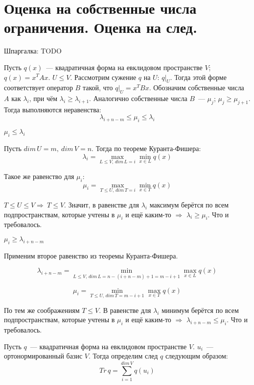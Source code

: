 \section{
 Оценка на собственные числа ограничения. Оценка на след.
}

Шпаргалка: TODO


Пусть $q(x)$~--- квадратичная форма на евклидовом пространстве $V$; $q(x) = x^TAx$. $U \le V$. Рассмотрим сужение $q$ на $U$: $q|_U$. Тогда этой форме соответствует оператор $B$ такой, что $q|_U = x^TBx$. Обозначим собственные числа $A$ как $\lambda_i$, при чём $\lambda_i \ge \lambda_{i+1}$. Аналогично собственные числа $B$~--- $\mu_j$; $\mu_j\ge \mu_{j + 1}$. Тогда выполняются неравенства:
$$
\lambda_{i+n-m}\le\mu_i\le\lambda_i
$$

\proofname

$\mu_i\le\lambda_i$

Пусть $dim\,U = m,\ dim\,V = n$. Тогда по теореме Куранта-Фишера:
$$
\lambda_i = \max\limits_{L \le V,\,dim\,L = i} \min\limits_{x\in L} q(x) 
$$

Такое же равенство для $\mu_i$:
$$
\mu_i = \max\limits_{T \le U,\,dim\,T = i} \min\limits_{x\in T} q(x) 
$$

$T\le U\le V\Rightarrow\ T\le V$. Значит, в равенстве для $\lambda_i$ максимум берётся по всем подпространствам, которые учтены в $\mu_i$ и ещё каким-то $\Rightarrow$ $\lambda_i \ge \mu_i$. Что и требовалось.

$\mu_i \ge \lambda_{i + n - m}$

Применим второе равенство из теоремы Куранта-Фишера.

$$
\lambda_{i+n-m} = \min\limits_{L \le V,\,dim\,L = n - (i + n - m) + 1 = m - i + 1} \max\limits_{x\in L} q(x) 
$$

$$
\mu_i = \min\limits_{T \le U,\,dim\,T = m - i + 1} \max\limits_{x\in T} q(x) 
$$

По тем же соображениям $T \le V$. В равенстве для $\lambda_i$ минимум берётся по всем подпространствам, которые учтены в $\mu_i$ и ещё каким-то $\Rightarrow$ $\lambda_{i + n - m}\le \mu_i$. Что и требовалось.


Пусть $q$~--- квадратичная форма на евклидовом пространстве $V$. $u_i$~--- ортонормированный базис $V$. Тогда определим след $q$ следующим образом:
$$
Tr\,q=\sum\limits_{i=1}^{dim\,V} q(u_i)
$$


